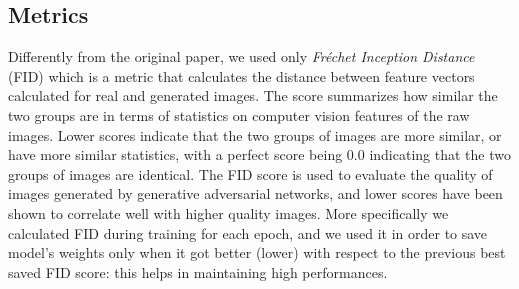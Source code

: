 \documentclass[12pt]{article}
\begin{document}
\subsection{Metrics}

Differently from the original paper, we used only \textit{Fréchet Inception Distance} (FID) which
is a metric that calculates the distance between feature vectors calculated for real and 
generated images.
The score summarizes how similar the two groups are in terms of statistics on computer vision 
features of the raw images. Lower scores indicate that the two groups of images are more similar, 
or have more similar statistics, with a perfect score being 0.0 indicating that the two 
groups of images are identical. The FID score is used to evaluate the quality of images 
generated by generative adversarial networks, and lower scores have been shown to correlate 
well with higher quality images. 
More specifically we calculated FID during training for each epoch, and we used it in order to
save model's weights only when it got better (lower) with respect to the previous best saved FID score:
this helps in maintaining high performances. 


\end{document}
